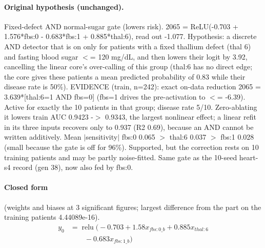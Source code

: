 \documentclass[a4paper,10pt]{article}
\newif\ifreviewmarks
\newcommand{\reviewrule}{\noindent{\color{BrickRed}\rule{\linewidth}{0.8pt}}}
\newenvironment{drafted}[1][]{%
  \ifreviewmarks\par\addvspace{\medskipamount}\reviewrule\par\nopagebreak
  \noindent{\color{BrickRed}\sffamily\footnotesize\textbf{Thesis Draft}\quad #1\hfill review}\par\nopagebreak\smallskip\fi}{%
  \ifreviewmarks\par\smallskip\noindent{\color{BrickRed}\sffamily\footnotesize end of thesis draft}\par\nopagebreak\reviewrule\par\medskip\fi}
\begin{document}
\begin{drafted}[plain-language layer: heart-s4-c1]
\paragraph{Original hypothesis (unchanged).} Fixed-defect AND normal-sugar gate (lowers risk). 2065 = ReLU(-0.703 + 1.576*fbs:0 - 0.683*fbs:1 + 0.885*thal:6), read out -1.077. Hypothesis: a discrete AND detector that is on only for patients with a fixed thallium defect (thal 6) and fasting blood sugar $<$= 120 mg/dL, and then lowers their logit by 3.92, cancelling the linear core's over-calling of this group (thal:6 has no direct edge; the core gives these patients a mean predicted probability of 0.83 while their disease rate is 50\%). EVIDENCE (train, n=242): exact on-data reduction 2065 = 3.639*[thal:6=1 AND fbs=0] (fbs=1 drives the pre-activation to $<$= -6.39). Active for exactly the 10 patients in that group; disease rate 5/10. Zero-ablating it lowers train AUC 0.9423 -$>$ 0.9343, the largest nonlinear effect; a linear refit in its three inputs recovers only to 0.937 (R2 0.69), because an AND cannot be written additively. Mean $|$sensitivity$|$ fbs:0 0.065 $>$ thal:6 0.037 $>$ fbs:1 0.028 (small because the gate is off for 96\%). Supported, but the correction rests on 10 training patients and may be partly noise-fitted. Same gate as the 10-seed heart-s4 record (gen 38), now also fed by fbs:0.
\paragraph{Closed form} {\footnotesize(weights and biases at 3 significant figures; largest difference from the part on the training patients 4.44089e-16).}
{\small\begingroup\allowdisplaybreaks
\begin{align*}
y_{0} &= \operatorname{relu}\bigl(-0.703 + 1.58 x_{fbs:0\_b} + 0.885 x_{thal:6} \\
&\qquad - 0.683 x_{fbs:1\_b}\bigr)
\end{align*}\endgroup}


\end{drafted}
\end{document}
